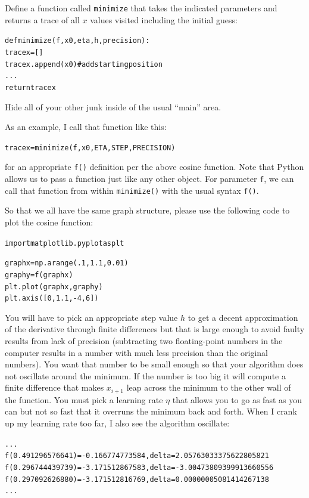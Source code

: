 \begin{fullwidth}
Define a function called {\tt minimize} that takes the indicated parameters and returns a trace of all $x$ values visited including the initial guess:

\begin{alltt}
def minimize(f, x0, eta, h, precision):
    tracex = []
    tracex.append(x0)  # add starting position
    ...
    return tracex
\end{alltt}

\noindent Hide all of your other junk inside of the usual ``main'' area.

As an example, I call that function like this:

\begin{alltt}
tracex = minimize(f, x0, ETA, STEP, PRECISION)
\end{alltt}

\noindent for an appropriate {\tt f()} definition per the above cosine function.  Note that Python allows us to pass a function just like any other object.  For parameter {\tt f}, we can call that function from within {\tt minimize()} with the usual syntax {\tt f()}.

So that we all have the same graph structure, please use the following code to plot the cosine function:

\begin{alltt}
import matplotlib.pyplot as plt

graphx = np.arange(.1,1.1,0.01)
graphy = f(graphx)
plt.plot(graphx,graphy)
plt.axis([0,1.1,-4,6])
\end{alltt}

You will have to pick an appropriate step value $h$ to get a decent approximation of the derivative through finite differences but that is large enough to avoid faulty results from lack of precision (subtracting two floating-point numbers in the computer results in a number with much less precision than the original numbers). You want that number to be small enough so that your algorithm does not oscillate around the minimum. If the number is too big it will compute a finite difference that makes $x_{i+1}$ leap across the minimum to the other wall of the function. You must pick a learning rate $\eta$ that allows you to go as fast as you can but not so fast that it overruns the minimum back and forth. When I crank up my learning rate too far, I also see the algorithm oscillate:

\begin{alltt}
...
f(0.491296576641) = -0.166774773584 , delta = 2.05763033375622805821
f(0.296744439739) = -3.171512867583 , delta = -3.00473809399913660556
f(0.297092626880) = -3.171512816769 , delta = 0.00000005081414267138
...
\end{alltt}


\end{fullwidth}
